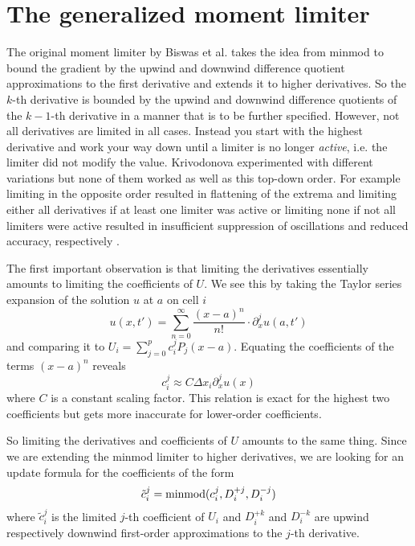 \section{The generalized moment limiter}
\label{sec:moment}

The original moment limiter by Biswas et al. takes the idea from minmod to bound the gradient by the upwind and downwind difference quotient approximations to the first derivative and extends it to higher derivatives.
So the $k$-th derivative is bounded by the upwind and downwind difference quotients of the $k - 1$-th derivative in a manner that is to be further specified.
However, not all derivatives are limited in all cases.
Instead you start with the highest derivative and work your way down until a limiter is no longer \emph{active}, i.e. the limiter did not modify the value.
Krivodonova experimented with different variations but none of them worked as well as this top-down order.
For example limiting in the opposite order resulted in flattening of the extrema and limiting either all derivatives if at least one limiter was active or limiting none if not all limiters were active resulted in insufficient suppression of oscillations and reduced accuracy, respectively \cite[remark 1]{Krivodonova}.

The first important observation is that limiting the derivatives essentially amounts to limiting the coefficients of $U$.
We see this by taking the Taylor series expansion of the solution $u$ at $a$ on cell $i$
\begin{equation*}
  u(x, t') = \sum_{n = 0}^{\infty} \frac{(x - a)^{n}}{n!} \cdot \partial_{x}^{j} u(a, t')
\end{equation*}
and comparing it to $U_{i} = \sum_{j = 0}^{p} c_{i}^{j} P_{j}(x - a)$.
Equating the coefficients of the terms $(x - a)^{n}$ reveals
\begin{equation*}
  c_{i}^{j} \approx C \Delta x_{i} \partial_{x}^{j} u(x)
\end{equation*}
where $C$ is a constant scaling factor.
This relation is exact for the highest two coefficients but gets more inaccurate for lower-order coefficients.

So limiting the derivatives and coefficients of $U$ amounts to the same thing.
Since we are extending the minmod limiter to higher derivatives, we are looking for an update formula for the coefficients of the form
\begin{equation*}
  \tilde{c}_{i}^{j} = \operatorname{minmod}(c_{i}^{j}, D_{i}^{+j}, D_{i}^{-j})
\end{equation*}
where $\tilde{c}_{i}^{j}$ is the limited $j$-th coefficient of $U_{i}$ and $D_{i}^{+k}$ and $D_{i}^{-k}$ are upwind respectively downwind first-order approximations to the $j$-th derivative.

